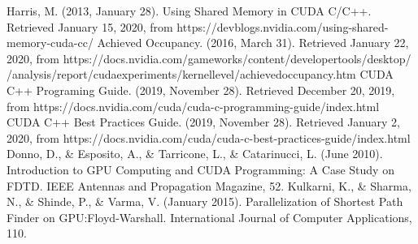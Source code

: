 \documentclass[conference]{IEEEtran}
\begin{document}
\begin{thebibliography}{00}
	 Harris, M. (2013, January 28). Using Shared Memory in CUDA C/C++. Retrieved January 15, 2020, from https://devblogs.nvidia.com/using-shared-memory-cuda-cc/
	 Achieved Occupancy. (2016, March 31). Retrieved January 22, 2020, from https://docs.nvidia.com/gameworks/content/developertools/desktop/
	/analysis/report/cudaexperiments/kernellevel/achievedoccupancy.htm
	 CUDA C++ Programing Guide. (2019, November 28). Retrieved December 20, 2019, from https://docs.nvidia.com/cuda/cuda-c-programming-guide/index.html
	 CUDA C++ Best Practices Guide. (2019, November 28). Retrieved January 2, 2020, from https://docs.nvidia.com/cuda/cuda-c-best-practices-guide/index.html
	 Donno, D., \& Esposito, A., \& Tarricone, L., \& Catarinucci, L. (June 2010). Introduction to GPU Computing and CUDA Programming: A Case Study on FDTD. IEEE Antennas and Propagation Magazine, 52.  
	 Kulkarni, K., \& Sharma, N., \& Shinde, P., \& Varma, V. (January 2015). Parallelization of Shortest Path Finder on GPU:Floyd-Warshall. International Journal of Computer Applications, 110. 
\end{thebibliography}
\end{document}
